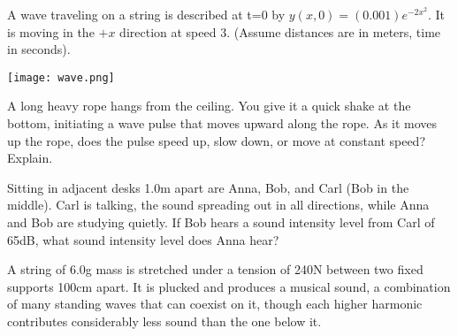 \documentclass{exam}
\begin{document}
\begin{questions}

\question [30] A wave traveling on a string is described at t=0 by $y(x,0) = (0.001)e^{-2x^2}$. It is moving in the $+x$ direction at speed 3. (Assume distances are in meters, time in seconds).

\texttt{[image: wave.png]}

\clearpage


\question [10] A long heavy rope hangs from the ceiling. You give it a quick shake at the bottom, initiating a wave pulse that moves upward along the rope. As it moves up the rope, does the pulse speed up, slow down, or move at constant speed? Explain.

\question [15] Sitting in adjacent desks 1.0m apart are Anna, Bob, and Carl (Bob in the middle). Carl is talking, the sound spreading out in all directions, while Anna and Bob are studying quietly. If Bob hears a sound intensity level from Carl of 65dB, what sound intensity level does Anna hear?
\clearpage


\question [25] A string of 6.0g mass is stretched under a tension of 240N between two fixed supports 100cm apart. It is plucked and produces a musical sound, a combination of many standing waves that can coexist on it, though each higher harmonic contributes considerably less sound than the one below it.
\begin{parts}

\end{parts}
\end{questions}
\end{document}

